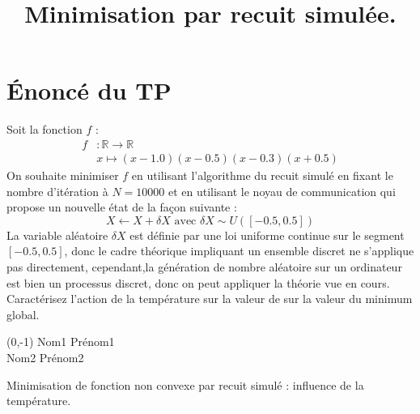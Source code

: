 \documentclass[10pt,a4paper]{article}
\title{Minimisation par recuit simulée. }
\date{}
\begin{document}
\maketitle

\section*{Énoncé du TP}
Soit la fonction $f$ : 
\begin{align*}
	f &: \mathbb{R} \rightarrow \mathbb{R}\\
	& x \mapsto (x-1.0)(x-0.5)(x-0.3)(x+0.5)
\end{align*}
On souhaite minimiser $f$ en utilisant l'algorithme du recuit simulé en fixant le nombre d’itération à $N=10000$ et en utilisant le noyau de communication qui propose un nouvelle état de la façon suivante : 
\begin{displaymath}
	X\leftarrow X+\delta X \text{ avec } \delta X \sim U([-0.5,0.5])
\end{displaymath}
La variable aléatoire $\delta X$ est définie par une loi uniforme continue sur le segment $[-0.5,0.5]$, donc le cadre théorique impliquant un ensemble discret ne s'applique pas directement, cependant,la génération de nombre aléatoire sur un ordinateur est bien un processus discret, donc on peut appliquer la théorie vue en cours. Caractérisez l'action de la température sur la valeur de sur la valeur du minimum global.


\clearpage

\begin{textblock}{4}(0,-1)
\noindent Nom1 Prénom1\\
Nom2 Prénom2
\end{textblock}

\begin{center}
	\LARGE{Minimisation de fonction non convexe par recuit simulé : influence de la température.}
\end{center}
\end{document}
